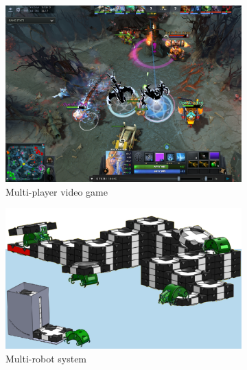 \begin{figure}[h]
    \begin{subfigure}[c]{0.32\textwidth}
        \centering
        \includegraphics[width=\textwidth]{Figures/MADRL/openaifive.png}
        \caption{Multi-player video game}
        \label{fig:Dota2}
    \end{subfigure}
    \hfill
    \begin{subfigure}[c]{0.35\textwidth}
        \centering
        \includegraphics[width=\textwidth]{Figures/MADRL/termes.png}
        \caption{Multi-robot system}
        \label{fig:termes}
    \end{subfigure}
    \hfill
    \begin{subfigure}[c]{0.27\textwidth}
        \centering

\end{subfigure}
\end{figure}
